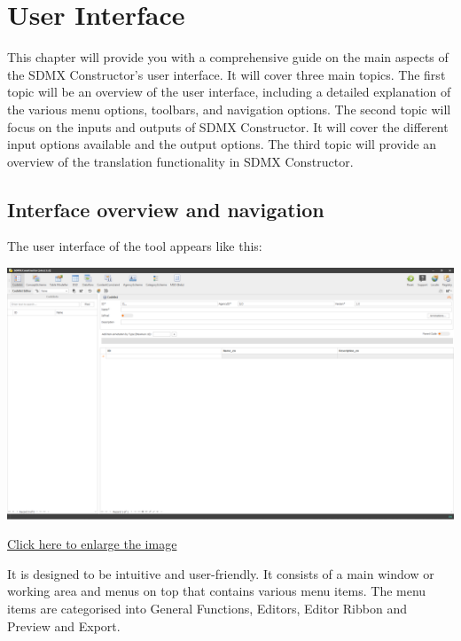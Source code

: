 \documentclass[
]{book}
\theoremstyle{definition}
\theoremstyle{definition}
\theoremstyle{definition}
\theoremstyle{definition}
\theoremstyle{remark}
\begin{document}
\hypertarget{user-interface}{%
\chapter{User Interface}\label{user-interface}}

This chapter will provide you with a comprehensive guide on the main aspects of the SDMX Constructor's user interface. It will cover three main topics. The first topic will be an overview of the user interface, including a detailed explanation of the various menu options, toolbars, and navigation options. The second topic will focus on the inputs and outputs of SDMX Constructor. It will cover the different input options available and the output options. The third topic will provide an overview of the translation functionality in SDMX Constructor.

\hypertarget{interface-overview-and-navigation}{%
\section{Interface overview and navigation}\label{interface-overview-and-navigation}}

The user interface of the tool appears like this:

\begin{center}\includegraphics[width=1\linewidth]{./images/image009} \end{center}

\href{images/image009.png}{Click here to enlarge the image}

It is designed to be intuitive and user-friendly. It consists of a main window or working area and menus on top that contains various menu items. The menu items are categorised into General Functions, Editors, Editor Ribbon and Preview and Export.
\end{document}
